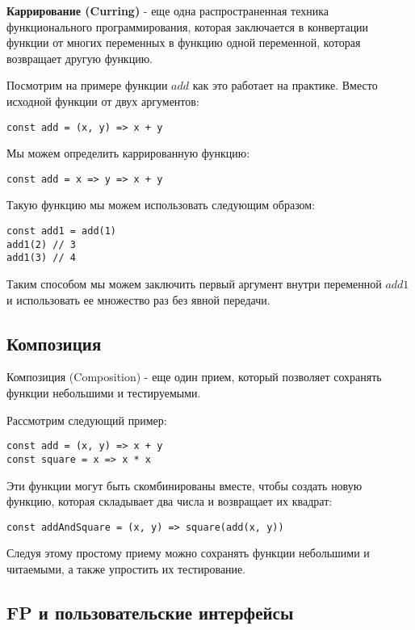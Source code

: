 \textbf{Каррирование (Curring)} - еще одна распространенная техника функционального программирования, которая заключается в конвертации функции от многих переменных в функцию одной переменной, которая возвращает другую функцию.

Посмотрим на примере функции $add$ как это работает на практике. Вместо исходной функции от двух аргументов:

\begin{lstlisting}
const add = (x, y) => x + y
\end{lstlisting}

Мы можем определить каррированную функцию:

\begin{lstlisting}
const add = x => y => x + y
\end{lstlisting}

Такую функцию мы можем использовать следующим образом:

\begin{lstlisting}
const add1 = add(1)
add1(2) // 3
add1(3) // 4
\end{lstlisting}

Таким способом мы можем заключить первый аргумент внутри переменной $add1$ и использовать ее множество раз без явной передачи.

\subsection{Композиция}

Композиция (Composition) - еще один прием, который позволяет сохранять функции небольшими и тестируемыми.

Рассмотрим следующий пример:

\begin{lstlisting}
const add = (x, y) => x + y
const square = x => x * x
\end{lstlisting}

Эти функции могут быть скомбинированы вместе, чтобы создать новую функцию, которая складывает два числа и возвращает их квадрат:

\begin{lstlisting}
const addAndSquare = (x, y) => square(add(x, y))
\end{lstlisting}

Следуя этому простому приему можно сохранять функции небольшими и читаемыми, а также упростить их тестирование.



\subsection{FP и пользовательские интерфейсы}

